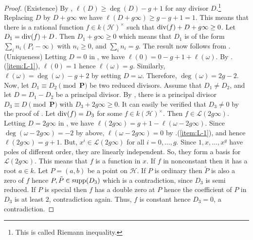\begin{proof}
(Existence) By , $\ell(D) \ge \deg(D) - g + 1$ for any divisor 
$D$.\footnote{This is called Riemann inequality.} Replacing $D$ by $D + g\infty$ we have $\ell(D + 
g\infty) \ge g - g + 1 = 1$. This means that there is a rational function $f \in 
k(\mathcal{H})^\times$ such that $\operatorname{div}(f) + D + g\infty \ge 0$. Let $D_1 = \operatorname{div}(f) + D$. 
Then $D_1 + g\infty \ge 0$ which means that $D_1$ is of the form $\sum_in_i(P_i - \infty)$ with $n_i 
\ge 0$, and $\sum_in_i = g$. The result now follows from . \\
(Uniqueness) Letting $D = 0$ in , we have $\ell(0) = 0 - g + 1 + 
\ell(\omega)$. By .(\ref{item:L-1}), $\ell(0) = 1$ hence 
$\ell(\omega) = g$. Similarly, $\ell(\omega) = \deg(\omega) - g + 2$ by setting $D = \omega$. 
Therefore, $\deg(\omega) = 2g - 2$. Now, let $D_1 \equiv D_2 \pmod {\mathbf{P}}$ be two reduced 
divisors. Assume that $D_1 \ne D_2$, and let $D = D_1 - D_2$ be a principal divisor. By 
, there is a principal divisor $D_3 \equiv D \pmod {\mathbf{P}}$ with $D_3 
+ 2g\infty \ge 0$. It can easily be verified that $D_3 \ne 0$ by the proof of 
. Let $\operatorname{div}(f) = D_3$ for some $f \in k(\mathcal{H})^\times$. Then $f 
\in \mathcal{L}(2g\infty)$. Letting $D = 2g\infty$ in , we have 
$\ell(2g\infty) = g + 1 - \ell(\omega - 2g\infty)$. Since $\deg(\omega - 2g\infty) = -2$ by above, 
$\ell(\omega - 2g\infty) = 0$ by .(\ref{item:L-1}), and hence 
$\ell(2g\infty) = g + 1$. But, $x^i \in \mathcal{L}(2g\infty)$ for all $i = 0, \dots, g$. Since $1, 
x, \dots, x^g$ have poles of different order, they are linearly independent. So, they form a basis 
for $\mathcal{L}(2g\infty)$. This means that $f$ is a function in $x$. If $f$ in nonconstant then it 
has a root $a \in k$. Let $P = (a, b)$ be a point on $\mathcal{H}$. If $P$ is ordinary then 
$\tilde{P}$ is also a zero of $f$ hence $P, \tilde{P} \in \operatorname{supp}(D_3)$ which is a contradiction, 
since $D_3$ is semi reduced. If $P$ is special then $f$ has a double zero at $P$ hence the 
coefficient of $P$ in $D_3$ is at least $2$, contradiction again. Thus, $f$ is constant hence $D_3 = 
0$, a contradiction. 
\end{proof}
